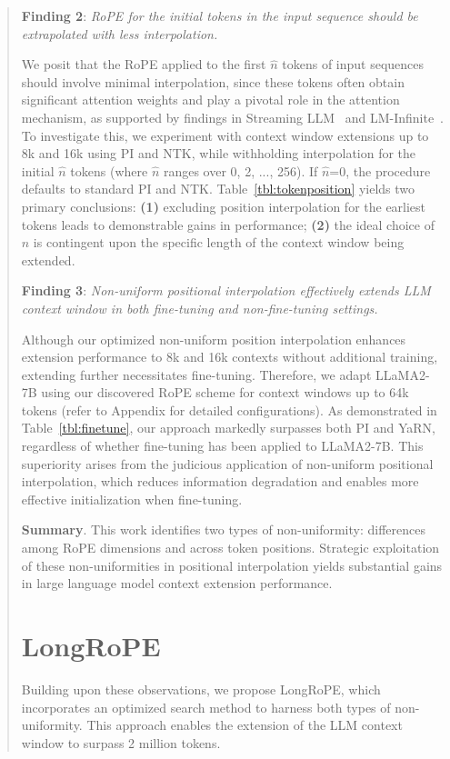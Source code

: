 \begin{abstract}
\textbf{Finding 2}: \textit{RoPE for the initial tokens in the input sequence should be extrapolated with less interpolation.} 

We posit that the RoPE applied to the first $\hat{n}$ tokens of input sequences should involve minimal interpolation, since these tokens often obtain significant attention weights and play a pivotal role in the attention mechanism, as supported by findings in Streaming LLM~\cite{streamingllm} and LM-Infinite~\cite{han2023lminfinite}. To investigate this, we experiment with context window extensions up to 8k and 16k using PI and NTK, while withholding interpolation for the initial $\hat n$ tokens (where $\hat n$ ranges over 0, 2, ..., 256). If $\hat n$=0, the procedure defaults to standard PI and NTK. Table~\ref{tbl:tokenposition} yields two primary conclusions: \textbf{(1)} excluding position interpolation for the earliest tokens leads to demonstrable gains in performance; \textbf{(2)} the ideal choice of $\hat n$ is contingent upon the specific length of the context window being extended.

\textbf{Finding 3}: \textit{Non-uniform positional interpolation effectively extends LLM context window in both fine-tuning and non-fine-tuning settings.} 

Although our optimized non-uniform position interpolation enhances extension performance to 8k and 16k contexts without additional training, extending further necessitates fine-tuning. Therefore, we adapt LLaMA2-7B using our discovered RoPE scheme for context windows up to 64k tokens (refer to Appendix for detailed configurations). As demonstrated in Table~\ref{tbl:finetune}, our approach markedly surpasses both PI and YaRN, regardless of whether fine-tuning has been applied to LLaMA2-7B. This superiority arises from the judicious application of non-uniform positional interpolation, which reduces information degradation and enables more effective initialization when fine-tuning.

\textbf{Summary}. This work identifies two types of non-uniformity: differences among RoPE dimensions and across token positions. Strategic exploitation of these non-uniformities in positional interpolation yields substantial gains in large language model context extension performance.

\section{LongRoPE}

\label{sec:method}
Building upon these observations, we propose LongRoPE, which incorporates an optimized search method to harness both types of non-uniformity. This approach enables the extension of the LLM context window to surpass 2 million tokens.


\end{abstract}
